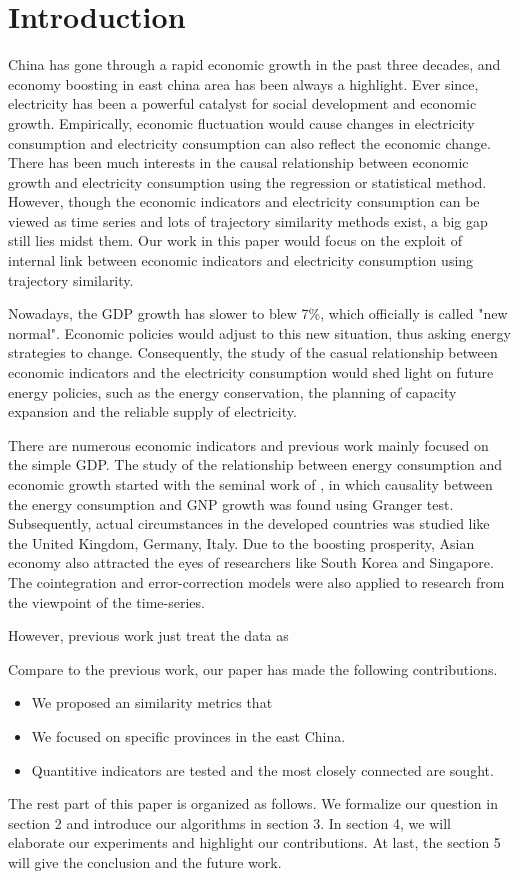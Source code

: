
\section{Introduction}
China has gone through a rapid economic growth in the past three decades, and economy boosting in east china area has been always a highlight. Ever since, electricity has been a powerful catalyst for social development and economic growth. Empirically, economic fluctuation would cause changes in electricity consumption and electricity consumption can also reflect the economic change. There has been much interests in the causal relationship between economic growth and electricity consumption using the regression or statistical method. However, though the economic indicators and electricity consumption can be viewed as time series and lots of trajectory similarity methods exist, a big gap still lies midst them. Our work in this paper would focus on the exploit of internal link between economic indicators and electricity consumption using trajectory similarity.

Nowadays, the GDP growth has slower to blew 7\%, which officially is called "new normal". Economic policies would adjust to this new situation, thus asking energy strategies to change. Consequently, the study of the casual relationship between economic indicators and the electricity consumption would shed light on future energy policies, such as the energy conservation, the planning of capacity expansion and the reliable supply of electricity.
  
There are numerous economic indicators and previous work mainly focused on the simple GDP. The study of the relationship between energy consumption and economic growth started with the seminal work of \cite{kraft:relationship}, in which causality between the energy consumption and GNP growth was found using Granger test. Subsequently, actual circumstances in the developed countries was studied like the United Kingdom, Germany, Italy\cite{yu:causal, erol1987causal}. Due to the boosting prosperity, Asian economy also attracted the eyes of researchers like South Korea and Singapore. The cointegration and error-correction models were also applied to research from the viewpoint of the time-series\cite{glasure1998cointegration}.

However, previous work just treat the data as 

Compare to the previous work, our paper has made the following contributions.
\begin{itemize}
	\item We proposed an similarity metrics that 
	\item We focused on specific provinces in the east China.
	\item Quantitive indicators are tested and the most closely connected are sought.
\end{itemize}

The rest part of this paper is organized as follows. We formalize our question in section 2 and introduce our algorithms in section 3. In section 4, we will elaborate our experiments and highlight our contributions. At last, the section 5 will give the conclusion and the future work.
